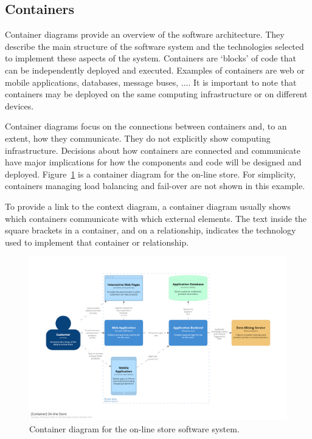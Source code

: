 \subsection{Containers}
Container diagrams provide an overview of the software architecture.
They describe the main structure of the software system and the technologies selected to implement these aspects of the system.
Containers are `blocks' of code that can be independently deployed and executed.
Examples of containers are web or mobile applications, databases, message buses, ....
It is important to note that containers may be deployed on the same computing infrastructure or on different devices.

Container diagrams focus on the connections between containers and, to an extent, how they communicate.
They do not explicitly show computing infrastructure.
Decisions about how containers are connected and communicate have major implications for how the components and code will be designed and deployed.
Figure~\ref{fig:c4_container_store} is a container diagram for the on-line store.
For simplicity, containers managing load balancing and fail-over are not shown in this example.

To provide a link to the context diagram, a container diagram usually shows which containers communicate with which external elements.
The text inside the square brackets in a container, and on a relationship, indicates the technology used to implement that container or relationship.

\begin{figure}[h!]
    \centering
    \begin{adjustwidth}{-9mm}{-9mm}
        \includegraphics[trim=195 190 200 185,clip,width=0.96\paperwidth]{images/c4/store_container_diagram.png}
    \end{adjustwidth}
    \caption{Container diagram for the on-line store software system.}
    \label{fig:c4_container_store}
\end{figure}

